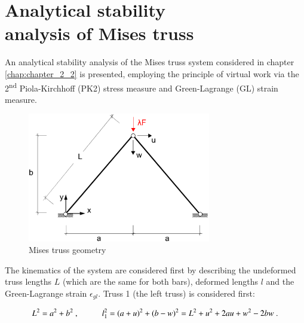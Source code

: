 
\chapter[Analytical stability analysis of Mises truss]{Analytical stability\\ analysis of Mises truss}
\label{app:Analytical stability analysis of Mises truss}
\renewcommand{\Thema}{Analytical stability analysis of Mises truss}

An analytical stability analysis of the Mises truss system considered in chapter \ref{chap:chapter_2_2} is presented, employing the principle of virtual work via the 2\textsuperscript{nd} Piola-Kirchhoff (PK2) stress measure and Green-Lagrange (GL) strain measure.

\begin{figure}[H]
	\centering
	\def\svgwidth{\columnwidth}
	\includegraphics[width=8cm]{images/mises_truss_def.png}
	\caption{Mises truss geometry}
	\label{pic:app0}
\end{figure}

The kinematics of the system are considered first by describing the undeformed truss lengths $L$ (which are the same for both bars), deformed lengths $l$ and the Green-Lagrange strain $\epsilon_{gl}$. Truss 1 (the left truss) is considered first:

\begin{equation} 
L^2 = a^2 + b^2\ ,
\hspace{10mm}
l_1^2 = (a+u)^2 + (b-w)^2 = L^2 + u^2 + 2au +w^2 -2bw
\label{eqapp0_1}\ .
\end{equation}

